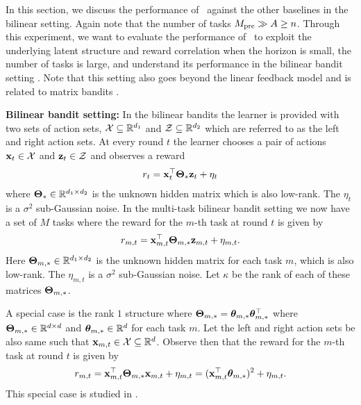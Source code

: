 In this section, we discuss the performance of \pred\ against the other baselines in the bilinear setting. 
%
%
Again note that the number of tasks $M_{\text{pre}} \gg A \geq n$.
%
%
Through this experiment, we want to evaluate the performance of \pred\ to exploit the underlying latent structure and reward correlation when the horizon is small, the number of tasks is large, and understand its performance in the bilinear bandit setting \citep{jun2019bilinear, lu2021low, kang2022efficient, mukherjee2023multi}.
%
Note that this setting also goes beyond the linear feedback model \citep{abbasi2011improved, lattimore2020bandit} and is related to matrix bandits \citep{yang2020reinforcement}.


\textbf{Bilinear bandit setting:} In the bilinear bandits the learner is provided with two sets of action sets, $\mathcal{X}\subseteq\mathbb{R}^{d_1}$ and $\mathcal{Z}\subseteq\mathbb{R}^{d_2}$ which are referred to as the left and right action sets. At every round $t$ the learner chooses a pair of actions $\mathbf{x}_t\in\mathcal{X}$ and $\mathbf{z}_t\in\mathcal{Z}$ and observes a reward 
\begin{align*}
    r_t = \mathbf{x}_t^\top \mathbf{\Theta}_* \mathbf{z}_t + \eta_t
\end{align*}
where $\mathbf{\Theta}_*\in\mathbb{R}^{d_1\times d_2}$ is the unknown hidden matrix which is also low-rank. The $\eta_t$ is a $\sigma^2$ sub-Gaussian noise. In the multi-task bilinear bandit setting we now have a set of $M$ tasks where the reward for the $m$-th task at round $t$ is given by
\begin{align*}
    r_{m,t} = \mathbf{x}_{m,t}^\top \mathbf{\Theta}_{m,*} \mathbf{z}_{m,t} + \eta_{m,t}.
\end{align*}
Here  $\mathbf{\Theta}_{m,*}\in\mathbb{R}^{d_1\times d_2}$ is the unknown hidden matrix for each task $m$, which is also low-rank. The $\eta_{m,t}$ is a $\sigma^2$ sub-Gaussian noise. Let $\kappa$ be the rank of each of these matrices $\mathbf{\Theta}_{m, *}$.

A special case is the rank $1$ structure where $\mathbf{\Theta}_{m, *} = \boldsymbol{\theta}_{m,*}\boldsymbol{\theta}_{m,*}^\top$ where $\mathbf{\Theta}_{m,*} \in \mathbb{R}^{d \times d}$ and $\boldsymbol{\theta}_{m,*}\in\mathbb{R}^d$ for each task $m$. Let the left and right action sets be also same such that $\mathbf{x}_{m,t} \in \mathcal{X} \subseteq \mathbb{R}^{d}$. Observe then that the reward for the $m$-th task at round $t$ is given by
\begin{align*}
    r_{m,t} = \mathbf{x}_{m,t}^\top \mathbf{\Theta}_{m,*} \mathbf{x}_{m,t} + \eta_{m,t} = (\mathbf{x}_{m,t}^\top\boldsymbol{\theta}_{m, *})^2 + \eta_{m,t}.
\end{align*}
This special case is studied in \citet{chaudhuri2017active}.

